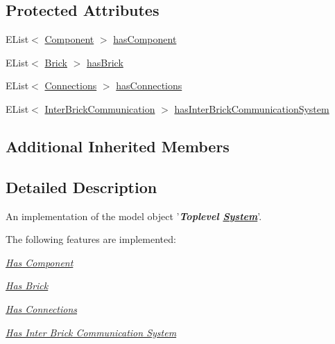 \subsection*{Protected Attributes}
\begin{DoxyCompactItemize}
\item 
E\-List$<$ \hyperlink{interfaceshootingmachineemfmodel_1_1_component}{Component} $>$ \hyperlink{classshootingmachineemfmodel_1_1impl_1_1_toplevel_system_impl_ad957b4842a741d20f0af80c1a2387788}{has\-Component}
\item 
E\-List$<$ \hyperlink{interfaceshootingmachineemfmodel_1_1_brick}{Brick} $>$ \hyperlink{classshootingmachineemfmodel_1_1impl_1_1_toplevel_system_impl_a0c99e3acf1ec181250a9a9b01412c160}{has\-Brick}
\item 
E\-List$<$ \hyperlink{interfaceshootingmachineemfmodel_1_1_connections}{Connections} $>$ \hyperlink{classshootingmachineemfmodel_1_1impl_1_1_toplevel_system_impl_af0237d255bd5b1c2cdc006971f06cd04}{has\-Connections}
\item 
E\-List$<$ \hyperlink{interfaceshootingmachineemfmodel_1_1_inter_brick_communication}{Inter\-Brick\-Communication} $>$ \hyperlink{classshootingmachineemfmodel_1_1impl_1_1_toplevel_system_impl_aa42422d9f63e92d2fbd9a5e792d5ab1d}{has\-Inter\-Brick\-Communication\-System}
\end{DoxyCompactItemize}
\subsection*{Additional Inherited Members}


\subsection{Detailed Description}
An implementation of the model object '{\itshape {\bfseries Toplevel \hyperlink{interfaceshootingmachineemfmodel_1_1_system}{System}}}'.

The following features are implemented\-: 
\begin{DoxyItemize}
\item \hyperlink{classshootingmachineemfmodel_1_1impl_1_1_toplevel_system_impl_a2c4366fdd20080d3612a84e0e71352a7}{{\itshape Has Component}} 
\item \hyperlink{classshootingmachineemfmodel_1_1impl_1_1_toplevel_system_impl_abec9aaf492636fbdff5e1fba81413cc0}{{\itshape Has Brick}} 
\item \hyperlink{classshootingmachineemfmodel_1_1impl_1_1_toplevel_system_impl_a6eb5ebd679d93fa77dbcbe3118defadc}{{\itshape Has Connections}} 
\item \hyperlink{classshootingmachineemfmodel_1_1impl_1_1_toplevel_system_impl_aa988e6aa9d9405ebfba8d30a9e1c7689}{{\itshape Has Inter Brick Communication System}} 
\end{DoxyItemize}

